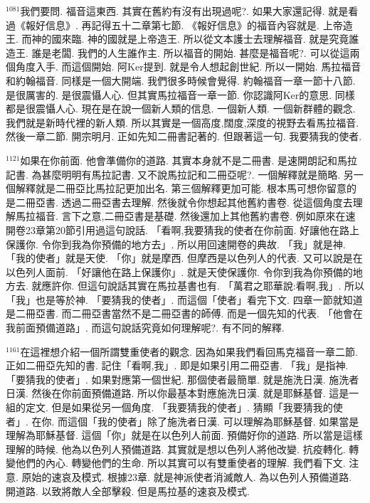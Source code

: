 \documentclass{book}
\begin{document}
$^{1081}$我們要問.
福音這東西.
其實在舊約有沒有出現過呢?.
如果大家還記得.
就是看過《報好信息》.
再記得五十二章第七節.
《報好信息》的福音內容就是.
上帝造王.
而神的國來臨.
神的國就是上帝造王.
所以從文本護士去理解福音.
就是究竟誰造王.
誰是老闆.
我們的人生誰作主.
所以福音的開始.
甚麼是福音呢?.
可以從這兩個角度入手.
而這個開始.
阿Ker提到.
就是令人想起創世紀.
所以一開始.
馬拉福音和約翰福音.
同樣是一個大開端.
我們很多時候會覺得.
約翰福音一章一節十八節.
是很厲害的.
是很震懾人心.
但其實馬拉福音一章一節.
你認識阿Ker的意思.
同樣都是很震懾人心.
現在是在說一個新人類的信息.
一個新人類.
一個新群體的觀念.
我們就是新時代裡的新人類.
所以其實是一個高度,闊度,深度的視野去看馬拉福音.
然後一章二節.
開宗明月.
正如先知二冊書記著的.
但跟著這一句.
我要猜我的使者.

$^{1121}$如果在你前面.
他會準備你的道路.
其實本身就不是二冊書.
是速開朗記和馬拉記書.
為甚麼明明有馬拉記書.
又不說馬拉記和二冊亞呢?.
一個解釋就是簡略.
另一個解釋就是二冊亞比馬拉記更加出名.
第三個解釋更加可能.
根本馬可想你留意的是二冊亞書.
透過二冊亞書去理解.
然後就令你想起其他舊約書卷.
從這個角度去理解馬拉福音.
言下之意,二冊亞書是基礎.
然後還加上其他舊約書卷.
例如原來在速開卷23章第20節引用過這句說話.
「看啊,我要猜我的使者在你前面.
好讓他在路上保護你.
令你到我為你預備的地方去」.
所以用回速開卷的典故.
「我」就是神.
「我的使者」就是天使.
「你」就是摩西.
但摩西是以色列人的代表.
又可以說是在以色列人面前.
「好讓他在路上保護你」.
就是天使保護你.
令你到我為你預備的地方去.
就應許你.
但這句說話其實在馬拉基書也有.
「萬君之耶華說:看啊,我」.
所以「我」也是等於神.
「要猜我的使者」.
而這個「使者」看完下文.
四章一節就知道是二冊亞書.
而二冊亞書當然不是二冊亞書的師傅.
而是一個先知的代表.
「他會在我前面預備道路」.
而這句說話究竟如何理解呢?.
有不同的解釋.

$^{1161}$在這裡想介紹一個所謂雙重使者的觀念.
因為如果我們看回馬克福音一章二節.
正如二冊亞先知的書.
記住「看啊,我」.
即是如果引用二冊亞書.
「我」是指神.
「要猜我的使者」.
如果對應第一個世紀.
那個使者最簡單.
就是施洗日漢.
施洗者日漢.
然後在你前面預備道路.
所以你最基本對應施洗日漢.
就是耶穌基督.
這是一組的定文.
但是如果從另一個角度.
「我要猜我的使者」.
猜顯「我要猜我的使者」.
在你.
而這個「我的使者」除了施洗者日漢.
可以理解為耶穌基督.
如果當是理解為耶穌基督.
這個「你」就是在以色列人前面.
預備好你的道路.
所以當是這樣理解的時候.
他為以色列人預備道路.
其實就是想以色列人將他改變.
抗疫轉化.
轉變他們的內心.
轉變他們的生命.
所以其實可以有雙重使者的理解.
我們看下文.
注意.
原始的速哀及模式.
根據23章.
就是神派使者消滅敵人.
為以色列人預備道路.
開道路.
以致將敵人全部擊殺.
但是馬拉基的速哀及模式.
\end{document}
